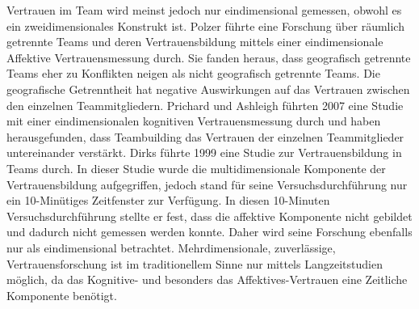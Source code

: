 \documentclass[a4paper,11pt]{article}%
\renewcommand{\\}{\vspace*{0.5\baselineskip} \newline}
\begin{document}
Vertrauen im Team wird meinst jedoch nur eindimensional gemessen, obwohl es ein zweidimensionales Konstrukt ist.
Polzer führte eine Forschung über räumlich getrennte Teams und deren Vertrauensbildung mittels einer eindimensionale Affektive Vertrauensmessung durch. Sie fanden heraus, dass geografisch getrennte Teams eher zu Konflikten neigen als nicht geografisch getrennte Teams. Die geografische Getrenntheit hat negative Auswirkungen auf das Vertrauen zwischen den einzelnen Teammitgliedern.  \citep[p.682]{polzer2006extending}
Prichard und Ashleigh führten 2007 eine Studie mit einer eindimensionalen kognitiven Vertrauensmessung durch und haben herausgefunden, dass Teambuilding das Vertrauen der einzelnen Teammitglieder untereinander verstärkt. \citep[p.704]{prichard2007effects}
Dirks führte 1999 eine Studie zur Vertrauensbildung in Teams durch. In dieser Studie wurde die multidimensionale Komponente der Vertrauensbildung aufgegriffen, jedoch stand für seine Versuchsdurchführung nur ein 10-Minütiges Zeitfenster zur Verfügung. In diesen 10-Minuten Versuchsdurchführung stellte er fest, dass die affektive Komponente nicht gebildet und dadurch nicht gemessen werden konnte. \citep[p.445]{mayer1995integrative} Daher wird seine Forschung ebenfalls nur als eindimensional betrachtet.
Mehrdimensionale, zuverlässige, Vertrauensforschung ist im traditionellem Sinne nur mittels Langzeitstudien möglich, da das Kognitive- und besonders das Affektives-Vertrauen eine Zeitliche Komponente benötigt. \citep{jones1998experience}

\end{document}
